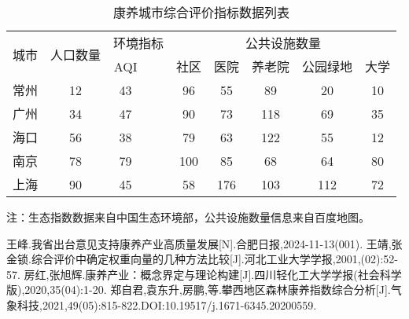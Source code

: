 \documentclass[12pt,a4paper]{article}
\begin{document}
\begin{table}[h]
  \centering
  \caption{康养城市综合评价指标数据列表}
  \begin{tabular}{c|c|ccc|ccccc}
    \hline
    \multirow{2}{*}{城市} & \multirow{2}{*}{人口数量} & \multicolumn{3}{c|}{环境指标} & \multicolumn{5}{c}{公共设施数量}   \\
    \cline{3-10}
                          &                          &  AQI  &          &           & 社区 & 医院 & 养老院 & 公园绿地 &大学\\
    \hline
    常州 & 12 & 43 &&& 96 & 55 & 89 & 20 & 10 \\
    广州 & 34 & 47 &&& 90 & 73 & 118 & 69 & 35 \\
    海口 & 56 & 38 &&& 79 & 63 & 122 & 55 & 12 \\
    南京 & 78 & 79 &&& 100 & 85 & 68 & 64 & 80\\
    上海 & 90 & 45 &&& 58 & 176 & 103 & 112 & 72 \\
    \hline
  \end{tabular}

  \vspace{0.5em}
  {\footnotesize 注：生态指数数据来自中国生态环境部，公共设施数量信息来自百度地图。}
\end{table}

\newpage
\begin{thebibliography}{99}
         王峰.我省出台意见支持康养产业高质量发展[N].合肥日报,2024-11-13(001).
         王靖,张金锁.综合评价中确定权重向量的几种方法比较[J].河北工业大学学报,2001,(02):52-57.
         房红,张旭辉.康养产业：概念界定与理论构建[J].四川轻化工大学学报(社会科学版),2020,35(04):1-20.
         郑自君,袁东升,房鹏,等.攀西地区森林康养指数综合分析[J].气象科技,2021,49(05):815-822.DOI:10.19517/j.1671-6345.20200559.

\end{thebibliography}
\end{document}
